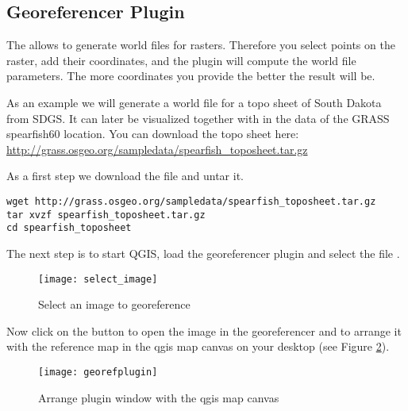 
\subsection{Georeferencer Plugin}


The  allows to generate world files for rasters.
Therefore you select points on the raster, add their coordinates, and the plugin will compute the world file parameters.
The more coordinates you provide the better the result will be.

As an example we will generate a world file for a topo sheet of South Dakota from SDGS.
It can later be visualized together with in the data of the GRASS spearfish60 location.
You can download the topo sheet here: \url{http://grass.osgeo.org/sampledata/spearfish\_toposheet.tar.gz}

As a first step we download the file and untar it.

\begin{verbatim}
wget http://grass.osgeo.org/sampledata/spearfish_toposheet.tar.gz
tar xvzf spearfish_toposheet.tar.gz
cd spearfish_toposheet
\end{verbatim}

The next step is to start QGIS, load the georeferencer plugin and select the file .

\begin{figure}[ht]
\begin{center}
\caption{Select an image to georeference \nixcaption}\label{fig:select_image}\smallskip
  \texttt{[image: select\_image]}
\end{center}
\end{figure}

Now click on the button  to open the image in
the georeferencer and to arrange it with the reference map in the qgis map
canvas on your desktop (see Figure \ref{fig:georefplugin}).

\begin{figure}[ht]
\begin{center}
  \caption{Arrange plugin window with the qgis map canvas \nixcaption}\label{fig:georefplugin}\smallskip
  \texttt{[image: georefplugin]}
\end{center}
\end{figure}

